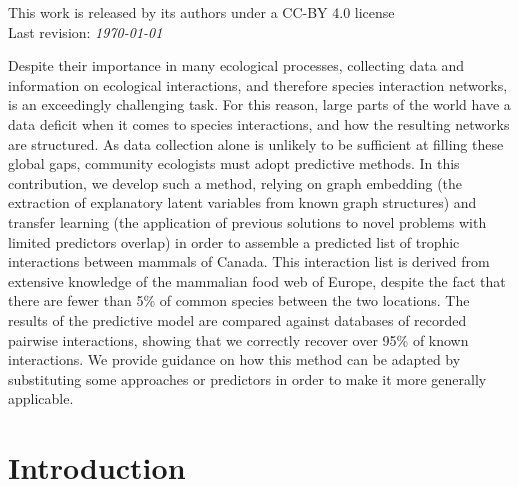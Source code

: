 \documentclass[11pt]{article}
\begin{document}
\vfill
This work is released by its authors under a CC-BY 4.0 license\hfill\ccby\\
Last revision: \emph{\today}

\clearpage
\thispagestyle{empty}

\vfill
Despite their importance in many ecological processes, collecting data
and information on ecological interactions, and therefore species
interaction networks, is an exceedingly challenging task. For this
reason, large parts of the world have a data deficit when it comes to
species interactions, and how the resulting networks are structured. As
data collection alone is unlikely to be sufficient at filling these
global gaps, community ecologists must adopt predictive methods. In this
contribution, we develop such a method, relying on graph embedding (the
extraction of explanatory latent variables from known graph structures)
and transfer learning (the application of previous solutions to novel
problems with limited predictors overlap) in order to assemble a
predicted list of trophic interactions between mammals of Canada. This
interaction list is derived from extensive knowledge of the mammalian
food web of Europe, despite the fact that there are fewer than 5\% of
common species between the two locations. The results of the predictive
model are compared against databases of recorded pairwise interactions,
showing that we correctly recover over 95\% of known interactions. We
provide guidance on how this method can be adapted by substituting some
approaches or predictors in order to make it more generally applicable.



\vfill

\clearpage
\linenumbers
\pagestyle{normal}

\hypertarget{introduction}{%
\section{Introduction}\label{introduction}}
\end{document}
